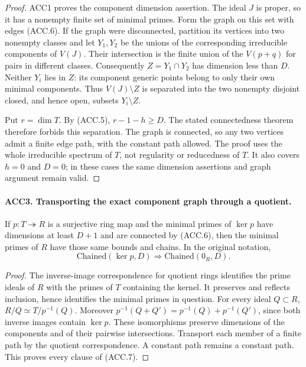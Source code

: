 \begin{proof}
ACC1 proves the component dimension assertion.  The ideal \(J\)
is proper, so it has a nonempty finite set of minimal primes.
Form the graph on this set with edges (ACC.6).  If the graph were
disconnected, partition its vertices into two nonempty classes and
let \(Y_1,Y_2\) be the unions of the corresponding irreducible
components of \(V(J)\).  Their intersection is the finite union
of the \(V(p+q)\) for pairs in different classes.  Consequently
\(Z=Y_1\cap Y_2\) has dimension less than \(D\).
Neither \(Y_i\) lies in \(Z\): its component generic points
belong to only their own minimal components.  Thus
\(V(J)\setminus Z\) is separated into the two nonempty disjoint
closed, and hence open, subsets \(Y_i\setminus Z\).

Put \(r=\dim T\).  By (ACC.5), \(r-1-h\ge D\).
The stated connectedness theorem therefore forbids this separation.
The graph is connected, so any two vertices admit a finite edge
path, with the constant path allowed.  The proof uses the whole
irreducible spectrum of \(T\), not regularity or reducedness of
\(T\).  It also covers \(h=0\) and \(D=0\); in these cases
the same dimension assertions and graph argument remain valid.
\end{proof}

\paragraph{ACC3. Transporting the exact component graph through a quotient.}
\label{claim:ACC3}
If \(p:T\twoheadrightarrow R\) is a surjective ring map and
the minimal primes of \(\ker p\) have dimensions at least
\(D+1\) and are connected by (ACC.6), then the minimal primes of
\(R\) have those same bounds and chains.  In the original notation,
\[
             \mathrm{Chained}(\ker p,D)
                 \Longrightarrow \mathrm{Chained}(0_R,D).
                                                               \tag{ACC.7}
\]

\begin{proof}
The inverse-image correspondence for quotient rings identifies the
prime ideals of \(R\) with the primes of \(T\) containing the
kernel.  It preserves and reflects inclusion, hence identifies the
minimal primes in question.  For every ideal \(Q\subset R\),
\(R/Q\simeq T/p^{-1}(Q)\).  Moreover
\(p^{-1}(Q+Q')=p^{-1}(Q)+p^{-1}(Q')\), since both inverse images
contain \(\ker p\).  These isomorphisms preserve dimensions of
the components and of their pairwise intersections.  Transport each
member of a finite path by the quotient correspondence.  A constant
path remains a constant path.  This proves every clause of (ACC.7).
\end{proof}

